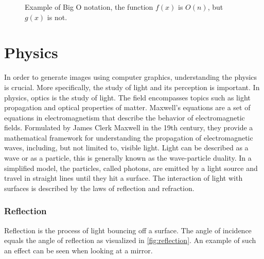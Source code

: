 \begin{figure}[H]
  \centering
  \caption{Example of Big O notation, the function $f(x)$ is $O(n)$, but $g(x)$ is not.}
  \label{fig:big-o-visualization}
\end{figure}

\section{Physics}
\label{ch:physics}

In order to generate images using computer graphics, understanding the physics is crucial. More specifically, the study of light and its perception is important. In physics, optics is the study of light. The field encompasses topics such as light propagation and optical properties of matter. Maxwell's equations are a set of equations in electromagnetism that describe the behavior of electromagnetic fields. Formulated by James Clerk Maxwell in the 19th century, they provide a mathematical framework for understanding the propagation of electromagnetic waves, including, but not limited to, visible light. Light can be described as a wave or as a particle, this is generally known as the wave-particle duality. \cite{fowles1989introduction} In a simplified model, the particles, called photons, are emitted by a light source and travel in straight lines until they hit a surface. The interaction of light with surfaces is described by the laws of reflection and refraction.

\subsubsection{Reflection}

Reflection is the process of light bouncing off a surface. The angle of incidence equals the angle of reflection as visualized in \autoref{fig:reflection}. An example of such an effect can be seen when looking at a mirror.

